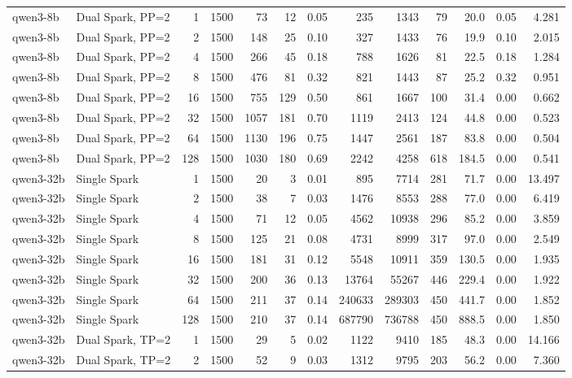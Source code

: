 \begin{tabular}{l l r r r r r r r r r r r}
\addlinespace
qwen3-8b & Dual Spark, PP=2 & 1 & 1500 & 73\rlap{$^\dagger$} & 12 & 0.05 & 235 & 1343 & 79 & 20.0 & 0.05 & 4.281 \\
qwen3-8b & Dual Spark, PP=2 & 2 & 1500 & 148 & 25 & 0.10 & 327 & 1433 & 76 & 19.9 & 0.10 & 2.015 \\
qwen3-8b & Dual Spark, PP=2 & 4 & 1500 & 266 & 45 & 0.18 & 788 & 1626 & 81 & 22.5 & 0.18 & 1.284 \\
qwen3-8b & Dual Spark, PP=2 & 8 & 1500 & 476 & 81 & 0.32 & 821 & 1443 & 87 & 25.2 & 0.32 & 0.951 \\
qwen3-8b & Dual Spark, PP=2 & 16 & 1500 & 755 & 129 & 0.50 & 861 & 1667 & 100 & 31.4 & 0.00 & 0.662 \\
qwen3-8b & Dual Spark, PP=2 & 32 & 1500 & 1057 & 181 & 0.70 & 1119 & 2413 & 124 & 44.8 & 0.00 & 0.523 \\
qwen3-8b & Dual Spark, PP=2 & 64 & 1500 & 1130 & 196 & 0.75 & 1447 & 2561 & 187 & 83.8 & 0.00 & 0.504 \\
qwen3-8b & Dual Spark, PP=2 & 128 & 1500 & 1030 & 180 & 0.69 & 2242 & 4258 & 618 & 184.5 & 0.00 & 0.541 \\
\addlinespace
qwen3-32b & Single Spark & 1 & 1500 & 20\rlap{$^\dagger$} & 3 & 0.01 & 895 & 7714 & 281 & 71.7 & 0.00 & 13.497 \\
qwen3-32b & Single Spark & 2 & 1500 & 38\rlap{$^\dagger$} & 7 & 0.03 & 1476 & 8553 & 288 & 77.0 & 0.00 & 6.419 \\
qwen3-32b & Single Spark & 4 & 1500 & 71\rlap{$^\dagger$} & 12 & 0.05 & 4562 & 10938 & 296 & 85.2 & 0.00 & 3.859 \\
qwen3-32b & Single Spark & 8 & 1500 & 125 & 21 & 0.08 & 4731 & 8999 & 317 & 97.0 & 0.00 & 2.549 \\
qwen3-32b & Single Spark & 16 & 1500 & 181 & 31 & 0.12 & 5548 & 10911 & 359 & 130.5 & 0.00 & 1.935 \\
qwen3-32b & Single Spark & 32 & 1500 & 200 & 36 & 0.13 & 13764 & 55267 & 446 & 229.4 & 0.00 & 1.922 \\
qwen3-32b & Single Spark & 64 & 1500 & 211 & 37 & 0.14 & 240633 & 289303 & 450 & 441.7 & 0.00 & 1.852 \\
qwen3-32b & Single Spark & 128 & 1500 & 210 & 37 & 0.14 & 687790 & 736788 & 450 & 888.5 & 0.00 & 1.850 \\
\addlinespace
qwen3-32b & Dual Spark, TP=2 & 1 & 1500 & 29\rlap{$^\dagger$} & 5 & 0.02 & 1122 & 9410 & 185 & 48.3 & 0.00 & 14.166 \\
qwen3-32b & Dual Spark, TP=2 & 2 & 1500 & 52\rlap{$^\dagger$} & 9 & 0.03 & 1312 & 9795 & 203 & 56.2 & 0.00 & 7.360 \\

\end{tabular}
